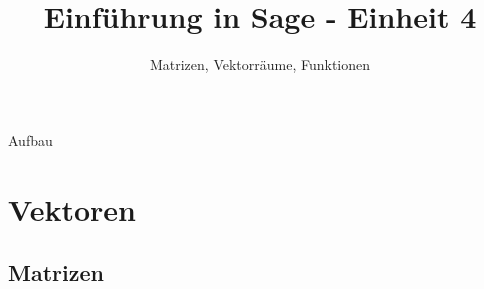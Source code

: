 \documentclass[hyperref={xetex}]{beamer}
\title{Einführung in Sage - Einheit 4}
\subtitle{Matrizen, Vektorräume, Funktionen}
\begin{document}
\titlepage

\begin{frame}{Aufbau}
\tableofcontents
\end{frame}


\section{Vektoren}
\subsection{Matrizen}

%
%
%
%
%
\end{document}
